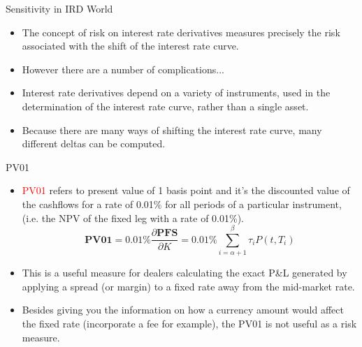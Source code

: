 \documentclass{beamer}
\begin{document}
\begin{frame}{Sensitivity in IRD World}
\begin{itemize}
\item<1-> The concept of risk on interest rate derivatives measures precisely the risk associated with the shift of the interest rate curve. 
\item<2-> However there are a number of complications...
\item<2-> Interest rate derivatives depend on a variety of instruments, used in the determination of the interest rate curve, rather than a single asset.
\item<3-> Because there are many ways of shifting the interest rate curve, many different deltas can be computed. 
\end{itemize}
\end{frame}

\begin{frame}{PV01}
\begin{itemize}
    \item<1-> \textcolor{red}{PV01} refers to present value of 1 basis point and it's the discounted value of the cashflows for a rate of 0.01\% for all periods of a particular instrument, (i.e. the NPV of the fixed leg with a rate of 0.01\%).
	\begin{equation}
	   \textbf{PV01} = 0.01\% \frac{\partial \textbf{PFS}}{\partial K} = 0.01\% \sum_{i=\alpha+1}^\beta\tau_iP(t,T_i)
	\end{equation}
	\item<2-> This is a useful measure for dealers calculating the exact P\&L generated by applying a spread (or margin) to a fixed rate away from the mid-market rate.
   \item<3-> Besides giving you the information on how a currency amount would affect the fixed rate (incorporate a fee for example), the PV01 is not useful as a risk measure. 
\end{itemize}
\end{frame}
\end{document}
